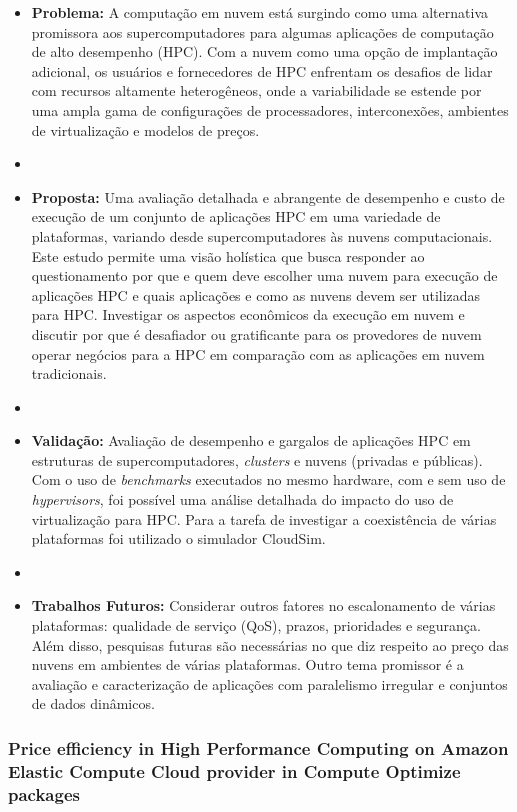 \documentclass[tese,capa]{texufpel}
\begin{document}
\begin{itemize}[label={},noitemsep]
  \item \textbf{Problema:} A computação em nuvem está surgindo como uma alternativa promissora aos supercomputadores para algumas aplicações de computação de alto desempenho (HPC). Com a nuvem como uma opção de implantação adicional, os usuários e fornecedores de HPC enfrentam os desafios de lidar com recursos altamente heterogêneos, onde a variabilidade se estende por uma ampla gama de configurações de processadores, interconexões, ambientes de virtualização e modelos de preços.
  \item 
  \item \textbf{Proposta:} Uma avaliação detalhada e abrangente de desempenho e custo de execução de um conjunto de aplicações HPC em uma variedade de plataformas, variando desde supercomputadores às nuvens computacionais. Este estudo permite uma visão holística que busca responder ao questionamento por que e quem deve escolher uma nuvem para execução de aplicações HPC e quais aplicações e como as nuvens devem ser utilizadas para HPC. Investigar os aspectos econômicos da execução em nuvem e discutir por que é desafiador ou gratificante para os provedores de nuvem operar negócios para a HPC em comparação com as aplicações em nuvem tradicionais.
  \item 
  \item \textbf{Validação:} Avaliação de desempenho e gargalos de aplicações HPC em estruturas de supercomputadores, \textit{clusters} e nuvens (privadas e públicas). Com o uso de \textit{benchmarks} executados no mesmo hardware, com e sem uso de \textit{hypervisors}, foi possível uma análise detalhada do impacto do uso de virtualização para HPC. Para a tarefa de investigar a coexistência de várias plataformas foi utilizado o simulador CloudSim.
  \item 
  \item \textbf{Trabalhos Futuros:} Considerar outros fatores no escalonamento de várias plataformas: qualidade de serviço (QoS), prazos, prioridades e segurança. Além disso, pesquisas futuras são necessárias no que diz respeito ao preço das nuvens em ambientes de várias plataformas. Outro tema promissor é a avaliação e caracterização de aplicações com paralelismo irregular e conjuntos de dados dinâmicos.
\end{itemize}

\subsubsection{Price efficiency in High Performance Computing on Amazon Elastic Compute Cloud provider in Compute Optimize packages \cite{prukkantragornPriceEfficiencyHigh2016b}}
\end{document}
